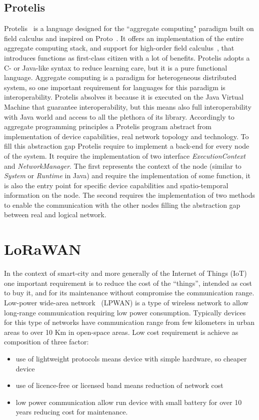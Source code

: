 \subsection{Protelis}
\label{subSec:Protelis}
Protelis~\cite{PianiniSAC2015} is a language designed for the ``aggregate computing" paradigm built on field calculus and inspired on Proto~\cite{Proto}. 
It offers an implementation of the entire aggregate computing stack, and support for high-order field calculus~\cite{ViroliTOCL2016}, that introduces functions as first-class citizen with a lot of benefits.
Protelis adopts a C- or Java-like syntax to reduce learning care, but it is a pure functional language.
Aggregate computing is a paradigm for heterogeneous distributed system, so one important requirement for languages for this paradigm is interoperability.
Protelis absolves it because it is executed on the Java Virtual Machine that guarantee interoperability, but this means also full interoperability with Java world and access to all the plethora of its library.
Accordingly to aggregate programming principles a Protelis program abstract from implementation of device capabilities, real network topology and technology. To fill this abstraction gap Protelis require to implement a back-end for every node of the system.
It require the implementation of two interface \textit{ExecutionContext} and \textit{NetworkManager}. The first represents the context of the node (similar to \textit{System} or \textit{Runtime} in Java) and require the implementation of some function, it is also the entry point for specific device capabilities and spatio-temporal information on the node. The second requires the implementation of two methods to enable the communication with the other nodes filling the abstraction gap between real and logical network.
\clearpage
\section{LoRaWAN}
\label{sec:LoRaWAN}

In the context of smart-city and more generally of the Internet of Things (IoT) one important requirement is to reduce the cost of the ``things'', intended as cost to buy it, and for its maintenance without compromise the communication range.
Low-power wide-area network~\cite{Raza2017} (LPWAN) is a type of wireless network to allow long-range communication requiring low power consumption.
Typically devices for this type of networks have communication range from few kilometers in urban areas to over 10 Km in open-space areas.
Low cost requirement is achieve as composition of three factor:
\begin{itemize}
    \item use of lightweight protocols means device with simple hardware, so cheaper device
    \item use of licence-free or licensed band means reduction of network cost
    \item low power communication allow run device with small battery for over 10 years reducing cost for maintenance.
\end{itemize}

